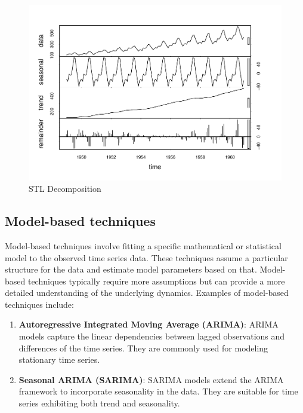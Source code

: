 \documentclass[
]{book}
\begin{document}
\begin{figure}

{\centering \includegraphics{DauR_files/figure-latex/stl2-1} 

}

\caption{STL Decomposition}\label{fig:stl2}
\end{figure}

\hypertarget{model-based-techniques}{%
\subsection*{Model-based techniques}\label{model-based-techniques}}

Model-based techniques involve fitting a specific mathematical or statistical model to the observed time series data. These techniques assume a particular structure for the data and estimate model parameters based on that. Model-based techniques typically require more assumptions but can provide a more detailed understanding of the underlying dynamics. Examples of model-based techniques include:

\begin{enumerate}
\def\labelenumi{\arabic{enumi}.}
\item
  \textbf{Autoregressive Integrated Moving Average (ARIMA)}: ARIMA models capture the linear dependencies between lagged observations and differences of the time series. They are commonly used for modeling stationary time series.
\item
  \textbf{Seasonal ARIMA (SARIMA)}: SARIMA models extend the ARIMA framework to incorporate seasonality in the data. They are suitable for time series exhibiting both trend and seasonality.
\end{enumerate}
\end{document}
